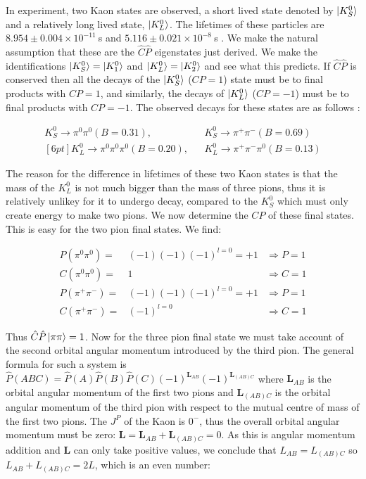 In experiment, two Kaon states are observed, a short lived state denoted by $\ket{K^{0}_{S}}$ and a relatively long lived state, $\ket{K^{0}_{L}}$. The lifetimes of these particles are $8.954 \pm 0.004 \times 10^{−11}~$s and $5.116 \pm 0.021 \times 10^{−8}~$s \cite{PDGliveKaonLifetime}. We make the natural assumption that these are the $\hat{C}\hat{P}$ eigenstates just derived. We make the identifications $\ket{K^{0}_{S}} = \ket{K^{0}_{1}}$ and $\ket{K^{0}_{L}} = \ket{K^{0}_{2}}$ and see what this predicts. If $\hat{C}\hat{P}$ is conserved then all the decays of the $\ket{K^{0}_{S}}$ ($CP = 1$) state must be to final products with $CP = 1$, and similarly, the decays of $\ket{K^{0}_{L}}$ ($CP = -1$) must be to final products with $CP = -1$. The observed decays for these states are as follows \cite[pg. 292]{Martin+Shaw}:

\begin{eqnarray*}    
K^{0}_S \rightarrow \pi^0 \pi^0 (B = 0.31),  &   &   K^{0}_{S} \rightarrow \pi^{+} \pi^{-} (B = 0.69)\\ [6pt]
K^{0}_L \rightarrow \pi^0 \pi^0 \pi^0 (B = 0.20),   &   &   K^{0}_{L} \rightarrow \pi^{+}  \pi^{-} \pi^0 (B =0.13)  
\end{eqnarray*}    

\noindent The reason for the difference in lifetimes of these two Kaon states is that the mass of the $K^{0}_L$ is not much bigger than the mass of three pions, thus it is relatively unlikey for it to undergo decay, compared to the $K^{0}_S$ which must only create energy to make two pions. We now determine the $CP$ of these final states. This is easy for the two pion final states. We find:

\begin{align}
{P} ({\pi^0 \pi^0})   = & (-1)(-1)(-1)^{l=0} = +1 & \Rightarrow P = 1  \\
{C} ({\pi^0 \pi^0})   = & 1                       & \Rightarrow C = 1  \\
{P} ({\pi^+ \pi^-})   = & (-1)(-1)(-1)^{l=0} = +1 & \Rightarrow P = 1  \\
\label{TwoPionFinalStateCalc}
{C} ({\pi^+ \pi^-})   = & (-1)^{l=0}             & \Rightarrow C = 1 
\end{align}

\noindent Thus $\hat{C}\hat{P} \ket{\pi \pi} = 1$. Now for the three pion final state we must take account of the second orbital angular momentum introduced by the  third pion. The general formula for such a system is $\hat{P} (ABC) = \hat{P} (A) \hat{P} (B) \hat{P}(C) (-1)^{\mathbf{L}_{AB}} (-1)^{\mathbf{L}_{(AB)C}}$ where $\mathbf{L}_{AB}$ is the orbital angular momentum of the first two pions and $\mathbf{L}_{(AB)C}$ is the orbital angular momentum of the third pion with respect to the mutual centre of mass of the first two pions. The $J^{P}$ of the Kaon is $0^{-}$, thus the overall orbital angular momentum must be zero: $\mathbf{L} = \mathbf{L}_{AB} + \mathbf{L}_{(AB)C} = 0$. As this is angular momentum addition and $\mathbf{L}$ can only take positive values, we conclude that ${L}_{AB} = {L}_{(AB)C}$ so ${L}_{AB} + {L}_{(AB)C} = 2L$, which is an even number: 

